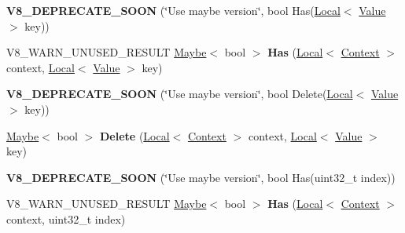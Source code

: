 \begin{DoxyCompactItemize}
\item 
\hypertarget{classv8_1_1Object_adbaa619d9f0588470c1e88532949da65}{}{\bfseries V8\+\_\+\+D\+E\+P\+R\+E\+C\+A\+T\+E\+\_\+\+S\+O\+O\+N} (\char`\"{}Use maybe version\char`\"{}, bool Has(\hyperlink{classv8_1_1Local}{Local}$<$ \hyperlink{classv8_1_1Value}{Value} $>$ key))\label{classv8_1_1Object_adbaa619d9f0588470c1e88532949da65}

\item 
\hypertarget{classv8_1_1Object_a57d4819c2cc13715ed22dd23cdc84d7c}{}V8\+\_\+\+W\+A\+R\+N\+\_\+\+U\+N\+U\+S\+E\+D\+\_\+\+R\+E\+S\+U\+L\+T \hyperlink{classv8_1_1Maybe}{Maybe}$<$ bool $>$ {\bfseries Has} (\hyperlink{classv8_1_1Local}{Local}$<$ \hyperlink{classv8_1_1Context}{Context} $>$ context, \hyperlink{classv8_1_1Local}{Local}$<$ \hyperlink{classv8_1_1Value}{Value} $>$ key)\label{classv8_1_1Object_a57d4819c2cc13715ed22dd23cdc84d7c}

\item 
\hypertarget{classv8_1_1Object_ad76afc75f558f317a80b4f4b83c5cd53}{}{\bfseries V8\+\_\+\+D\+E\+P\+R\+E\+C\+A\+T\+E\+\_\+\+S\+O\+O\+N} (\char`\"{}Use maybe version\char`\"{}, bool Delete(\hyperlink{classv8_1_1Local}{Local}$<$ \hyperlink{classv8_1_1Value}{Value} $>$ key))\label{classv8_1_1Object_ad76afc75f558f317a80b4f4b83c5cd53}

\item 
\hypertarget{classv8_1_1Object_ab0626985ff54cbeeccef5e50656e5481}{}\hyperlink{classv8_1_1Maybe}{Maybe}$<$ bool $>$ {\bfseries Delete} (\hyperlink{classv8_1_1Local}{Local}$<$ \hyperlink{classv8_1_1Context}{Context} $>$ context, \hyperlink{classv8_1_1Local}{Local}$<$ \hyperlink{classv8_1_1Value}{Value} $>$ key)\label{classv8_1_1Object_ab0626985ff54cbeeccef5e50656e5481}

\item 
\hypertarget{classv8_1_1Object_a54ea0720cf71e2898049d05c44ef2133}{}{\bfseries V8\+\_\+\+D\+E\+P\+R\+E\+C\+A\+T\+E\+\_\+\+S\+O\+O\+N} (\char`\"{}Use maybe version\char`\"{}, bool Has(uint32\+\_\+t index))\label{classv8_1_1Object_a54ea0720cf71e2898049d05c44ef2133}

\item 
\hypertarget{classv8_1_1Object_adfbff82d3a45a69415ae99013a654daa}{}V8\+\_\+\+W\+A\+R\+N\+\_\+\+U\+N\+U\+S\+E\+D\+\_\+\+R\+E\+S\+U\+L\+T \hyperlink{classv8_1_1Maybe}{Maybe}$<$ bool $>$ {\bfseries Has} (\hyperlink{classv8_1_1Local}{Local}$<$ \hyperlink{classv8_1_1Context}{Context} $>$ context, uint32\+\_\+t index)\label{classv8_1_1Object_adfbff82d3a45a69415ae99013a654daa}


\end{DoxyCompactItemize}
